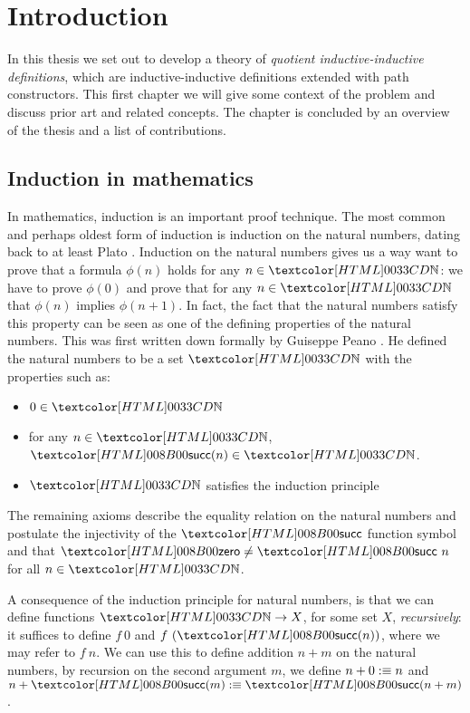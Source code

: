 \chapter{Introduction}
\label{intro}

In this thesis we set out to develop a theory of \emph{quotient
  inductive-inductive definitions}, which are inductive-inductive
definitions \cite{NordvallForsberg2013} extended with path
constructors. This first chapter we will give some context of the
problem and discuss prior art and related concepts. The chapter is
concluded by an overview of the thesis and a list of contributions.

\section{Induction in mathematics}

In mathematics, induction is an important proof technique. The most
common and perhaps oldest form of induction is induction on the
natural numbers, dating back to at least Plato
\cite{Acerbi2000}. Induction on the natural numbers gives us a way
want to prove that a formula $\phi(n)$ holds for any $n \in \natty$:
we have to prove $\phi(0)$ and prove that for any $n \in \natty$ that
$\phi(n)$ implies $\phi(n+1)$. In fact, the fact that the natural
numbers satisfy this property can be seen as one of the defining
properties of the natural numbers. This was first written down
formally by Guiseppe Peano \cite{Peano1889}. He defined the natural
numbers to be a set $\natty$ with the properties such as:
\begin{itemize}
\item $0 \in \natty$
\item for any $n \in \natty$, $\natsucc(n) \in \natty$.
\item $\natty$ satisfies the induction principle
\end{itemize}
The remaining axioms describe the equality relation on the natural
numbers and postulate the injectivity of the $\natsucc$ function
symbol and that $\natzero \neq \natsucc\ n$ for all $n \in \natty$.

A consequence of the induction principle for natural numbers, is that
we can define functions $\natty \to X$, for some set $X$,
\emph{recursively}: it suffices to define $f\ 0$ and
$f\ (\natsucc(n))$, where we may refer to $f\ n$. We can use this to
define addition $n + m$ on the natural numbers, by recursion on the
second argument $m$, \ie we define $n + 0 :\equiv n$ and
$n + \natsucc(m) \ddefeq \natsucc(n+m)$.

